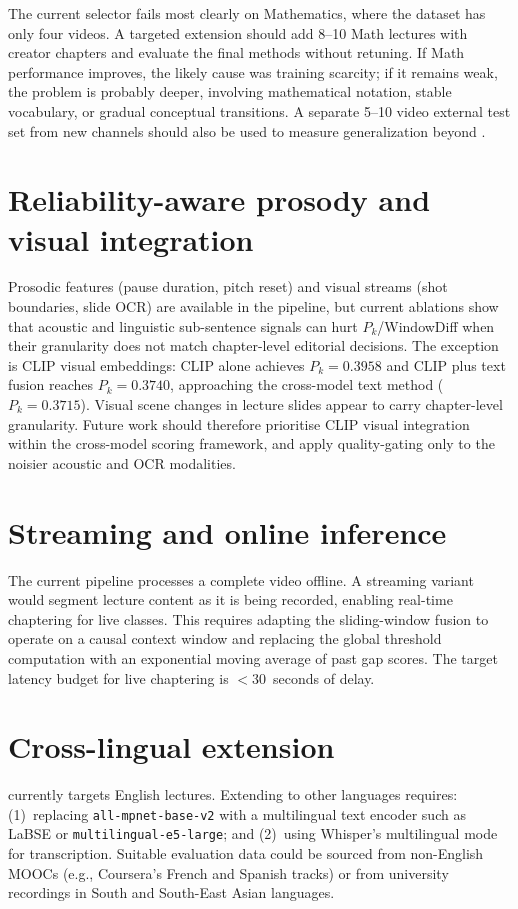The current selector fails most clearly on Mathematics, where the dataset has
only four videos. A targeted extension should add 8--10 Math lectures with
creator chapters and evaluate the final methods without retuning. If Math
performance improves, the likely cause was training scarcity; if it remains
weak, the problem is probably deeper, involving mathematical notation, stable
vocabulary, or gradual conceptual transitions. A separate 5--10 video external
test set from new channels should also be used to measure generalization beyond
\dataset{}.

\section{Reliability-aware prosody and visual integration}

Prosodic features (pause duration, pitch reset) and visual streams (shot
boundaries, slide OCR) are available in the pipeline, but current ablations show
that acoustic and linguistic sub-sentence signals can hurt $P_k$/WindowDiff
when their granularity does not match chapter-level editorial decisions.
The exception is CLIP visual embeddings: CLIP alone achieves $P_k=0.3958$ and
CLIP plus text fusion reaches $P_k=0.3740$, approaching the cross-model text
method ($P_k=0.3715$). Visual scene changes in lecture slides appear to carry
chapter-level granularity. Future work should therefore prioritise CLIP visual
integration within the cross-model scoring framework, and apply quality-gating
only to the noisier acoustic and OCR modalities.

\section{Streaming and online inference}

The current pipeline processes a complete video offline.
A streaming variant would segment lecture content as it is being recorded,
enabling real-time chaptering for live classes.
This requires adapting the sliding-window fusion to operate on a causal context
window and replacing the global threshold computation with an exponential moving
average of past gap scores.
The target latency budget for live chaptering is $<30$~seconds of delay.

\section{Cross-lingual extension}

\lecseg{} currently targets English lectures.
Extending to other languages requires: (1)~replacing \texttt{all-mpnet-base-v2}
with a multilingual text encoder such as LaBSE or \texttt{multilingual-e5-large};
and (2)~using Whisper's multilingual mode for
transcription.
Suitable evaluation data could be sourced from non-English MOOCs (e.g.,
Coursera's French and Spanish tracks) or from university recordings in South
and South-East Asian languages.

